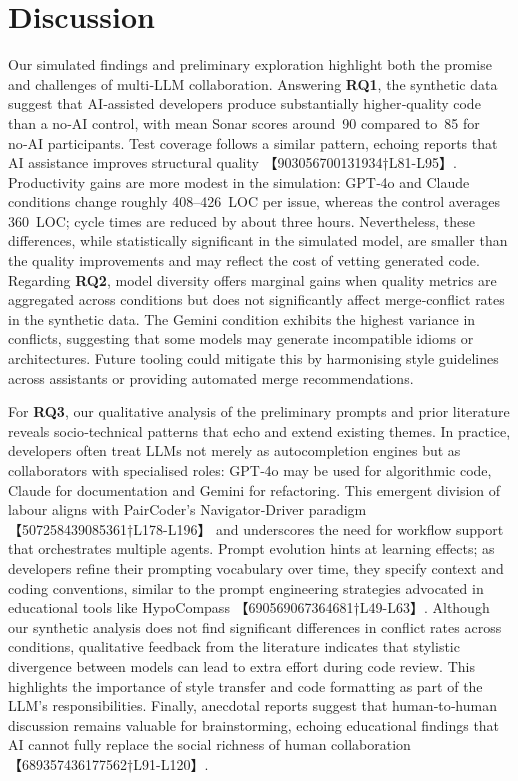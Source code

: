 \documentclass[conference]{IEEEtran}
\begin{document}
\section{Discussion}
Our simulated findings and preliminary exploration highlight both the promise and challenges of multi‑LLM collaboration.  Answering \textbf{RQ1}, the synthetic data suggest that AI‑assisted developers produce substantially higher‑quality code than a no‑AI control, with mean Sonar scores around 90 compared to 85 for no‑AI participants.  Test coverage follows a similar pattern, echoing reports that AI assistance improves structural quality 【903056700131934†L81-L95】.  Productivity gains are more modest in the simulation: GPT‑4o and Claude conditions change roughly 408–426 LOC per issue, whereas the control averages 360 LOC; cycle times are reduced by about three hours.  Nevertheless, these differences, while statistically significant in the simulated model, are smaller than the quality improvements and may reflect the cost of vetting generated code.  Regarding \textbf{RQ2}, model diversity offers marginal gains when quality metrics are aggregated across conditions but does not significantly affect merge‑conflict rates in the synthetic data.  The Gemini condition exhibits the highest variance in conflicts, suggesting that some models may generate incompatible idioms or architectures.  Future tooling could mitigate this by harmonising style guidelines across assistants or providing automated merge recommendations.

For \textbf{RQ3}, our qualitative analysis of the preliminary prompts and prior literature reveals socio‑technical patterns that echo and extend existing themes.  In practice, developers often treat LLMs not merely as autocompletion engines but as collaborators with specialised roles: GPT‑4o may be used for algorithmic code, Claude for documentation and Gemini for refactoring.  This emergent division of labour aligns with PairCoder’s Navigator‑Driver paradigm 【507258439085361†L178-L196】 and underscores the need for workflow support that orchestrates multiple agents.  Prompt evolution hints at learning effects; as developers refine their prompting vocabulary over time, they specify context and coding conventions, similar to the prompt engineering strategies advocated in educational tools like HypoCompass 【690569067364681†L49-L63】.  Although our synthetic analysis does not find significant differences in conflict rates across conditions, qualitative feedback from the literature indicates that stylistic divergence between models can lead to extra effort during code review.  This highlights the importance of style transfer and code formatting as part of the LLM’s responsibilities.  Finally, anecdotal reports suggest that human‑to‑human discussion remains valuable for brainstorming, echoing educational findings that AI cannot fully replace the social richness of human collaboration 【689357436177562†L91-L120】.
\end{document}
